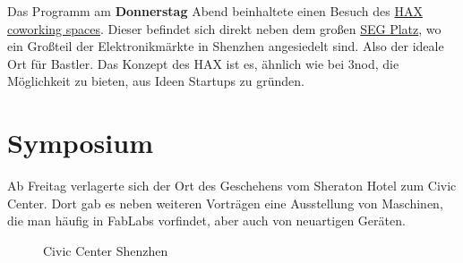 \documentclass{\basedir/fablab-document}
\begin{document}
Das Programm am \textbf{Donnerstag} Abend beinhaltete einen Besuch des
\href{https://hax.co/about/}{HAX coworking spaces}. Dieser befindet sich direkt neben
dem großen \href{https://en.wikipedia.org/wiki/SEG_Plaza}{SEG Platz},
wo ein Großteil der Elektronikmärkte in Shenzhen angesiedelt sind. Also
der ideale Ort für Bastler. Das Konzept des HAX ist es, ähnlich wie
bei 3nod, die Möglichkeit zu bieten, aus Ideen Startups zu gründen.

\section*{Symposium}

Ab Freitag verlagerte sich der Ort des Geschehens vom Sheraton Hotel zum
Civic Center. Dort gab es neben weiteren Vorträgen eine Ausstellung
von Maschinen, die man häufig in FabLabs vorfindet, aber auch von
neuartigen Geräten.

\begin{figure}[h]
	\noindent{}
	\caption{Civic Center Shenzhen}
	\label{civic_center}
\end{figure}
\end{document}
